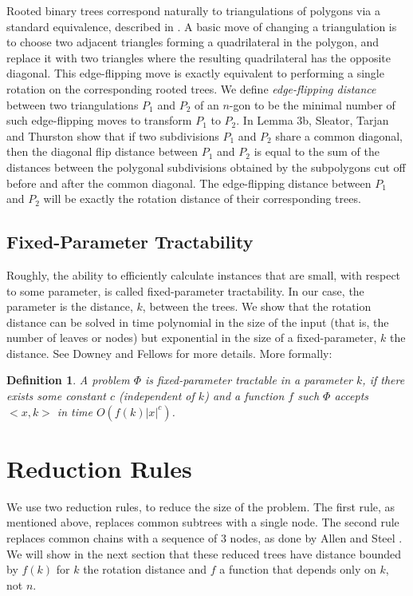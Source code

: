 \documentclass[12pt]{article}
\newtheorem{definition}{Definition}
\begin{document}
Rooted binary trees correspond naturally to triangulations of polygons via a standard equivalence, described in \cite{stt}.  A basic move of changing a triangulation is to choose two adjacent triangles forming a quadrilateral in the polygon, and replace it with two triangles where the resulting quadrilateral has the opposite diagonal.  This edge-flipping move is exactly equivalent to performing a single rotation on the corresponding rooted trees.   We define {\em edge-flipping distance} between two triangulations $P_1$ and $P_2$ of an $n$-gon to be the minimal number of such edge-flipping moves to transform $P_1$ to $P_2$.  
In Lemma 3b, Sleator, Tarjan and Thurston  \cite{stt} 
show that if two subdivisions $P_1$ and $P_2$ share a common diagonal, then 
the diagonal flip distance between $P_1$ and $P_2$ is equal to the sum 
of the distances between the polygonal subdivisions obtained by the subpolygons
cut off before and after the common diagonal.   
The edge-flipping distance between $P_1$ and $P_2$ will be exactly the rotation distance of their corresponding trees.

\subsection*{Fixed-Parameter Tractability}



Roughly, the ability to efficiently calculate instances that are small, with respect
to some parameter, is called fixed-parameter tractability.  In our case,
the parameter is the distance, $k$, between the trees.  We show
that the rotation distance can be solved in time 
polynomial in the size of the input (that is, the number of leaves or nodes) 
but exponential in the size of a 
fixed-parameter, $k$ the distance.  See Downey and Fellows \cite{Downey1999}
for more details.  More formally:

\begin{definition}  A problem $\Phi$ is {\em fixed-parameter tractable} in 
a parameter $k$, if there exists some constant $c$ (independent of $k$)
and a function $f$ such $\Phi$ accepts $<\!x,k\!>$ in time $O(f(k)|x|^c)$.
\end{definition}


\section{Reduction Rules}

We use two reduction rules,  to reduce the size
of the problem.  The first rule, as mentioned above, 
replaces common subtrees with a single node.  The
second rule replaces common chains with a sequence
of 3 nodes, as done by Allen and Steel \cite{allenSteel}.
We will show in the next section 
that these reduced trees have distance bounded
by $f(k)$ for $k$ the rotation distance and $f$ 
a function that depends only on $k$, not $n$.
\end{document}

